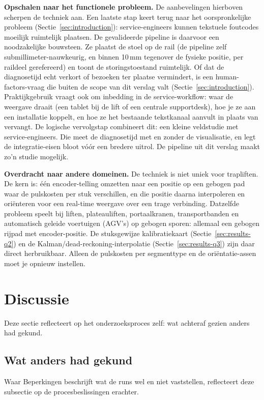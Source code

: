 \documentclass[10pt, a4paper, twocolumn]{article}
\begin{document}
\textbf{Opschalen naar het functionele probleem.} De aanbevelingen hierboven
scherpen de techniek aan. Een laatste stap keert terug naar het oorspronkelijke
probleem (Sectie~\ref{sec:introduction}): service-engineers kunnen tekstuele
foutcodes moeilijk ruimtelijk plaatsen. De gevalideerde pipeline is daarvoor een
noodzakelijke bouwsteen. Ze plaatst de stoel op de rail (de pipeline zelf
submillimeter-nauwkeurig, en binnen 10\,mm tegenover de fysieke positie, per
raildeel gerefereerd) en toont de storingstoestand ruimtelijk. Of dat de
diagnosetijd echt verkort of bezoeken ter plaatse vermindert, is een
human-factors-vraag die buiten de scope van dit verslag valt
(Sectie~\ref{sec:introduction}). Praktijkgebruik vraagt ook om inbedding in de
service-workflow: waar de weergave draait (een tablet bij de lift of een centrale
supportdesk), hoe je ze aan een installatie koppelt, en hoe ze het bestaande
tekstkanaal aanvult in plaats van vervangt. De logische vervolgstap combineert
dit: een kleine veldstudie met service-engineers. Die meet de diagnosetijd met en
zonder de visualisatie, en legt de integratie-eisen bloot vóór een bredere uitrol.
De pipeline uit dit verslag maakt zo'n studie mogelijk.

\textbf{Overdracht naar andere domeinen.} De techniek is niet uniek voor
trapliften. De kern is: één encoder-telling omzetten naar een positie op een
gebogen pad waar de pulskosten per stuk verschillen, en die positie daarna
interpoleren en oriënteren voor een real-time weergave over een trage verbinding.
Datzelfde probleem speelt bij liften, plateauliften, portaalkranen,
transportbanden en automatisch geleide voertuigen (AGV's) op gebogen sporen:
allemaal een gebogen rijpad met encoder-positie. De stuksgewijze kalibratiekaart
(Sectie~\ref{sec:results-q2}) en de Kalman/dead-reckoning-interpolatie
(Sectie~\ref{sec:results-q3}) zijn daar direct herbruikbaar. Alleen de pulskosten
per segmenttype en de oriëntatie-assen moet je opnieuw instellen.

\section{Discussie}
\label{sec:discussion}

Deze sectie reflecteert op het onderzoeksproces zelf: wat achteraf gezien anders
had gekund.

\subsection{Wat anders had gekund}
Waar Beperkingen beschrijft wat de runs wel en niet vaststellen, reflecteert deze
subsectie op de procesbeslissingen erachter.
\end{document}

